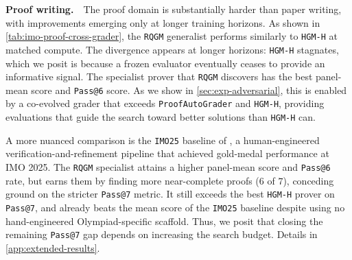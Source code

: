 \documentclass{paper}
\newcommand{\ourmethod}{\texttt{RQGM}\xspace}
\newcommand{\theourmethod}{the \ourmethod}
\newcommand{\Theourmethod}{The \ourmethod}
\newcommand{\hgmh}{\texttt{HGM-H}\xspace}
\newcommand{\proofautograder}{\texttt{ProofAutoGrader}\xspace}
\newcommand{\imocode}{\texttt{IMO25}\xspace}
\begin{document}
\noindent\textbf{Proof writing.}~~The proof domain is substantially harder than paper writing, with improvements emerging only at longer training horizons. As shown in \cref{tab:imo-proof-cross-grader}, \theourmethod generalist performs similarly to \hgmh at matched compute. The divergence appears at longer horizons: \hgmh stagnates, which we posit is because a frozen evaluator eventually ceases to provide an informative signal. The specialist prover that \ourmethod discovers has the best panel-mean score and \texttt{Pass@6} score. As we show in \cref{sec:exp-adversarial}, this is enabled by a co-evolved grader that exceeds \proofautograder and \hgmh, providing evaluations that guide the search toward better solutions than \hgmh can.



A more nuanced comparison is the \imocode baseline of \citet{huang2025winninggoldimo2025}, a human-engineered verification-and-refinement pipeline that achieved gold-medal performance at IMO 2025. \Theourmethod specialist attains a higher panel-mean score and \texttt{Pass@6} rate, but earns them by finding more near-complete proofs ($6$ of $7$), conceding ground on the stricter \texttt{Pass@7} metric. It still exceeds the best \hgmh prover on \texttt{Pass@7}, and already beats the mean score of the \imocode baseline despite using no hand-engineered Olympiad-specific scaffold. Thus, we posit that closing the remaining \texttt{Pass@7} gap depends on increasing the search budget. Details in \cref{app:extended-results}.
\end{document}
